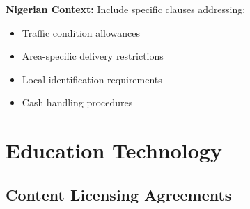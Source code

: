 \begin{tcolorbox}[colback=white,colframe=primarydark,title=\textbf{Delivery Network Documentation}]
\textbf{Nigerian Context:}
Include specific clauses addressing:
\begin{itemize}
    \item Traffic condition allowances
    \item Area-specific delivery restrictions
    \item Local identification requirements
    \item Cash handling procedures
\end{itemize}
\end{tcolorbox}

\section{Education Technology}

\subsection{Content Licensing Agreements}
